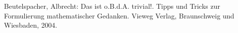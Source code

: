 \begin{thebibliography}{sotief}
     Beutelspacher, Albrecht: Das ist o.B.d.A. trivial!. Tipps und Tricks zur Formulierung mathematischer Gedanken. Vieweg Verlag, Braunschweig und Wiesbaden, 2004.
\end{thebibliography} 